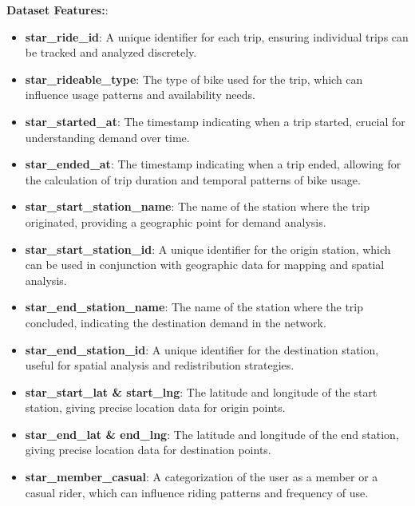 \documentclass[12pt, a4paper]{article}
\begin{document}
    \textbf{Dataset Features:}:
    \begin{itemize}
        \item \textbf{star\_ride\_id}: A unique identifier for each trip, ensuring individual trips can be tracked and analyzed discretely.
        \item \textbf{star\_rideable\_type}: The type of bike used for the trip, which can influence usage patterns and availability needs.
        \item \textbf{star\_started\_at}: The timestamp indicating when a trip started, crucial for understanding demand over time.
        \item \textbf{star\_ended\_at}: The timestamp indicating when a trip ended, allowing for the calculation of trip duration and temporal patterns of bike usage.
        \item \textbf{star\_start\_station\_name}: The name of the station where the trip originated, providing a geographic point for demand analysis.
        \item \textbf{star\_start\_station\_id}: A unique identifier for the origin station, which can be used in conjunction with geographic data for mapping and spatial analysis.
        \item \textbf{star\_end\_station\_name}: The name of the station where the trip concluded, indicating the destination demand in the network.
        \item \textbf{star\_end\_station\_id}: A unique identifier for the destination station, useful for spatial analysis and redistribution strategies.
        \item \textbf{star\_start\_lat \& start\_lng}: The latitude and longitude of the start station, giving precise location data for origin points.
        \item \textbf{star\_end\_lat \& end\_lng}: The latitude and longitude of the end station, giving precise location data for destination points.
        \item \textbf{star\_member\_casual}: A categorization of the user as a member or a casual rider, which can influence riding patterns and frequency of use.
    \end{itemize}
\end{document}
